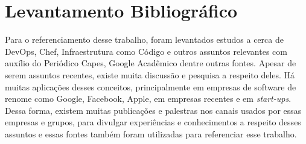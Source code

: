 \section{Levantamento Bibliográfico}

Para o referenciamento desse trabalho, foram levantados estudos a cerca de
DevOps, Chef, Infraestrutura como Código e outros assuntos relevantes com
auxílio do Periódico Capes, Google Acadêmico dentre outras fontes.
Apesar de serem assuntos recentes, existe muita discussão e pesquisa a
respeito deles. Há muitas aplicações desses conceitos, principalmente
em empresas de software de renome como Google, Facebook, Apple, em
empresas recentes e em \textit{start-ups}. Dessa forma, existem muitas publicações e %
palestras nos canais usados por essas empresas e grupos, para divulgar
experiências e conhecimentos a respeito desses assuntos e essas fontes
também foram utilizadas para referenciar esse trabalho.



